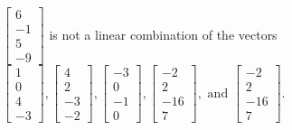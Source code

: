 \begin{exercise}
\begin{exerciseStatement}
  \end{exerciseStatement}
  \begin{exerciseAnswer}
   \(\left[\begin{array}{c}
6 \\
-1 \\
5 \\
-9
\end{array}\right]\) 
  	 is not  
	a linear combination of the vectors \(\left[\begin{array}{c}
1 \\
0 \\
4 \\
-3
\end{array}\right] , \left[\begin{array}{c}
4 \\
2 \\
-3 \\
-2
\end{array}\right] , \left[\begin{array}{c}
-3 \\
0 \\
-1 \\
0
\end{array}\right] , \left[\begin{array}{c}
-2 \\
2 \\
-16 \\
7
\end{array}\right] , \text{ and } \left[\begin{array}{c}
-2 \\
2 \\
-16 \\
7
\end{array}\right]\).

	
  


  \end{exerciseAnswer}
\end{exercise}
